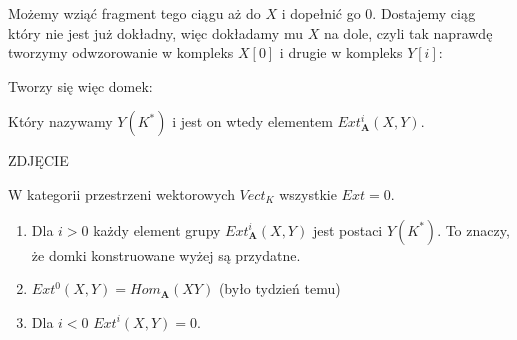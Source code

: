 Możemy wziąć fragment tego ciągu aż do $X$ i dopełnić go $0$. Dostajemy ciąg który nie jest już dokładny, więc dokładamy mu $X$ na dole, czyli tak naprawdę tworzymy odwzorowanie w kompleks $X[0]$ i drugie w kompleks $Y[i]$:
\begin{center}\end{center}
Tworzy się więc domek:
\begin{center}\end{center}
Który nazywamy $Y(K^*)$ i jest on wtedy elementem $Ext_{\mathbf{A}}^i(X, Y)$.

{\large\color{red}ZDJĘCIE}

\begin{example}
  \item W kategorii przestrzeni wektorowych $Vect_K$ wszystkie $Ext=0$.
\end{example}

\begin{theorem}
  \begin{enumerate}[label=(\alph*)]
    \item Dla $i>0$ każdy element grupy $Ext_{\mathbf{A}}^i(X, Y)$ jest postaci $Y(K^*)$. To znaczy, że domki konstruowane wyżej są przydatne.
    \item $Ext^0(X, Y)=Hom_{\mathbf{A}}(X Y)$ (było tydzień temu)
    \item Dla $i<0$ $Ext^i(X, Y)=0$.
  \end{enumerate}
\end{theorem}

